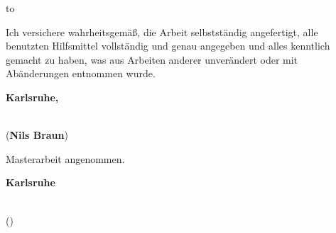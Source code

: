 \vspace*{36\baselineskip}
\hbox to \textwidth{\hrulefill}
\par
Ich versichere wahrheitsgemäß, die Arbeit selbstständig angefertigt, alle benutzten Hilfsmittel vollständig und genau angegeben und alles kenntlich gemacht zu haben, was aus Arbeiten anderer unverändert oder mit Abänderungen entnommen wurde.

\textbf{Karlsruhe, \submissiontime}
\vspace{1.5cm}

\dotfill\hspace*{8.0cm}\\
\hspace*{2cm}(\textbf{Nils Braun}) %


\thispagestyle{empty}

\clearpage

\vspace*{36\baselineskip}
Masterarbeit angenommen.

\textbf{Karlsruhe}
\vspace{1.5cm}

\dotfill\hspace*{8.0cm}\\
\hspace*{2cm}(\textbf{\reviewerone}) %


\thispagestyle{empty}
\cleardoublepage
